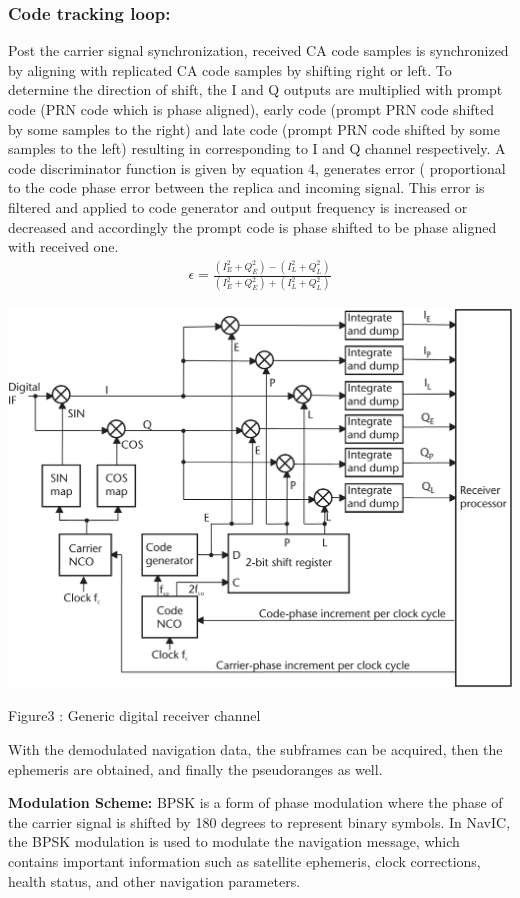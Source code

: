 \documentclass[10pt, onecolumn]{article}
\begin{document}
\begin{enumerate}
\subsubsection{Code tracking loop:}Post the carrier signal synchronization, received CA code samples is synchronized by aligning with replicated CA code samples by shifting right or left. To determine the direction of shift, the I and Q outputs are multiplied with prompt code (PRN code which is phase aligned), early code (prompt PRN code shifted by some samples to the right) and late code (prompt PRN code shifted by some samples to the left) resulting in corresponding to I and Q channel respectively. A code discriminator function is given by equation 4, generates error ( proportional to the code
phase error between the replica and incoming signal. This error is filtered and applied to code generator and output frequency is increased or decreased and accordingly the prompt code is phase shifted to be phase aligned with received one.
\begin{align}
\epsilon=\frac{(I^2_E+Q^2_E)-(I^2_L+Q^2_L)}{(I^2_E+Q^2_E)+(I^2_L+Q^2_L)}
\end{align}

\includegraphics[width=\linewidth]{./figures/dm1.png}
\begin{center}
Figure3 : Generic digital receiver channel
\end{center}
With the demodulated navigation data, the subframes can be acquired, then the ephemeris are obtained, and finally the pseudoranges as well.


\textbf{Modulation Scheme:} BPSK is a form of phase modulation where the phase of the carrier signal is shifted by 180 degrees to represent binary symbols. In NavIC, the BPSK modulation is used to modulate the navigation message, which contains important information such as satellite ephemeris, clock corrections, health status, and other navigation parameters.


\end{enumerate}
\end{document}
